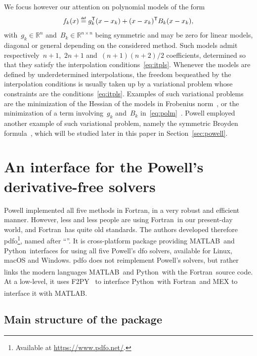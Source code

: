 \documentclass[11pt,draft]{article}
\numberwithin{equation}{section}
\def\defeq{\ensuremath{\mathrel{\stackrel{\text{\tiny\textsf{def}}}{=}}}}
\def\sft{\ensuremath{\mathsf{T}}}
\def\R{\ensuremath{\mathbb{R}}}
\def\obj{\ensuremath{f}}
\newcommand\objmdl[1][k]{\obj_{#1}}
\newcommand\iter[1][k]{x_{#1}}
\newcommand\grad[1][k]{g_{#1}}
\newcommand\hess[1][k]{B_{#1}}
\def\fortran{\mbox{Fortran}}
\def\matlab{\mbox{MATLAB\textsuperscript{\textregistered}}}
\def\python{\mbox{Python}}
\begin{document}
We focus however our attention on polynomial models of the form
\begin{equation}
    \label{eq:polm}
    \objmdl(x) \defeq \grad^{\sft} (x - \iter) + (x - \iter)^{\sft} \hess (x - \iter),
\end{equation}
with~$\grad \in \R^n$ and~$\hess \in \R^{n \times n}$ being symmetric and may be zero for linear models, diagonal or general depending on the considered method.
Such models admit respectively~$n + 1$,~$2n + 1$ and~$(n + 1)(n + 2) / 2$ coefficients, determined so that they satisfy the interpolation conditions~\eqref{eq:itpls}.
Whenever the models are defined by underdetermined interpolations, the freedom bequeathed by the interpolation conditions is usually taken up by a variational problem whose constraints are the conditions~\eqref{eq:itpls}.
Examples of such variational problems are the minimization of the Hessian of the models in Frobenius norm~\cite{Conn_Scheinberg_Toint_1998, Wild_2008}, or the minimization of a term involving~$\grad$ and~$\hess$ in~\eqref{eq:polm}~\cite{Conn_Toint_1996}.
Powell employed another example of such variational problem, namely the symmetric Broyden formula~\cite{Powell_1970b, Powell_2004a}, which will be studied later in this paper in Section~\ref{sec:powell}.

\section{An interface for the Powell's derivative-free solvers}
\label{sec:pdfo}

Powell implemented all five methods in \fortran, in a very robust and efficient manner.
However, less and less people are using \fortran\ in our present-day world, and \fortran\ has quite old standards.
The authors developed therefore \gls{pdfo}\footnote{Available at \url{https://www.pdfo.net/}.}, named after \enquote{}.
It is cross-platform package providing \matlab\ and \python\ interfaces for using all five Powell's \gls{dfo} solvers, available for Linux, macOS and Windows.
\Gls{pdfo} does not reimplement Powell's solvers, but rather links the modern languages \matlab\ and \python\ with the \fortran\ source code.
At a low-level, it uses F2PY~\cite{Peterson_2009} to interface \python\ with \fortran\, and MEX to interface it with \matlab.

\subsection{Main structure of the package}
\end{document}

